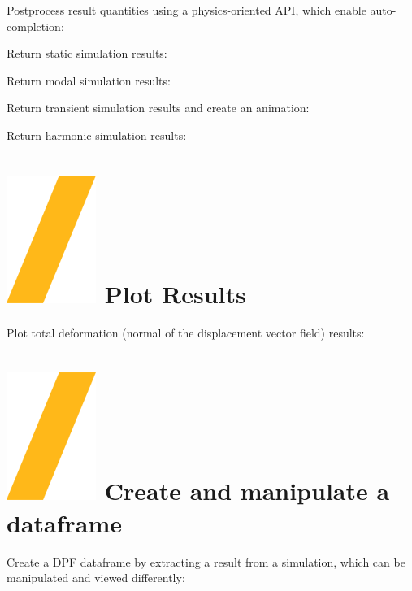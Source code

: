 \documentclass[9pt,landscape]{article}
\begin{document}
\begin{multicols}{3}
Postprocess result quantities using a physics-oriented API, which enable auto-completion:

\vspace{2mm} %

Return static simulation results:


Return modal simulation results:


Return transient simulation results and create an animation:


Return harmonic simulation results:


\section{\includegraphics[height=\fontcharht\font`\S]{slash.png} Plot Results}

Plot total deformation (normal of the displacement vector field) results:



\section{\includegraphics[height=\fontcharht\font`\S]{slash.png} Create and manipulate a dataframe}
Create a DPF dataframe by extracting a result from a simulation, which can be manipulated and viewed differently:


\end{multicols}
\end{document}
